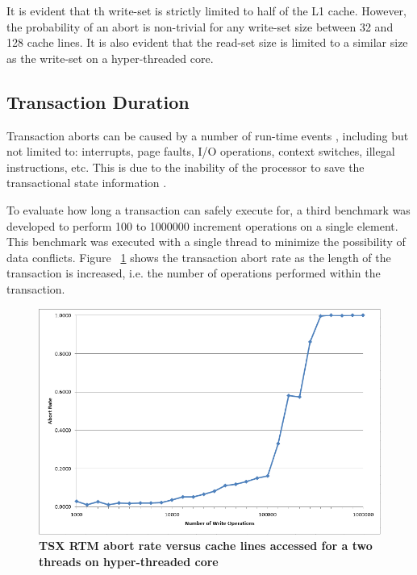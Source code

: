 \documentclass[a4paper]{article}
\begin{document}
\indent It is evident that th write-set is strictly limited to half of the L1
cache.  However, the probability of an abort is non-trivial for any write-set
size between 32 and 128 cache lines.  It is also evident that the read-set size
is limited to a similar size as the write-set on a hyper-threaded core.\par

\subsection{\textbf{Transaction Duration}}

\indent Transaction aborts can be caused by a number of run-time events
\cite{intel_prog_ref}, including but not limited to: interrupts, page faults,
I/O operations, context switches, illegal instructions, etc.  This is due to the
inability of the processor to save the transactional state information
\cite{schwahn}.\par

\indent To evaluate how long a transaction can safely execute for, a third
benchmark was developed to perform 100 to 1000000 increment operations on a
single element.  This benchmark was executed with a single thread to minimize
the possibility of data conflicts. Figure ~\ref{fig:trx_duration} shows the
transaction abort rate as the length of the transaction is increased, i.e. the
number of operations performed within the transaction.\par

\begin{figure}[H]
    \centering
    \graphicspath{ {./figures/} }
    \includegraphics[width=\textwidth,height=\textheight,keepaspectratio]{trx_duration}
    \caption{\textbf{TSX RTM abort rate versus cache lines accessed for a two 
    threads on hyper-threaded core}}
    \label{fig:trx_duration}
\end{figure}
\end{document}
